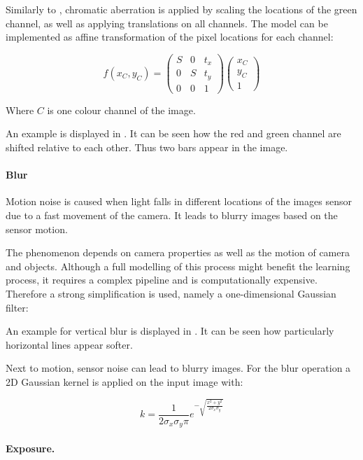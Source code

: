 Similarly to \cite{Carlson2018}, chromatic aberration is applied by scaling the locations of the green channel, as well as applying translations on all channels. The model can be implemented as affine transformation of the pixel locations for each channel:

\begin{equation}
f(x_C,y_C) = \begin{pmatrix}
S & 0 & t_x \\
0 & S & t_y \\
0 & 0 & 1
\end{pmatrix} \begin{pmatrix}
x_C \\
y_C \\
1
\end{pmatrix}
\end{equation}

Where $C$ is one colour channel of the image.

An example is displayed in . It can be seen how the red and green channel are shifted relative to each other. Thus two bars appear in the image.

\paragraph{Blur}

Motion noise is caused when light falls in different locations of the images sensor due to a fast movement of the camera. It leads to blurry images based on the sensor motion.

The phenomenon depends on camera properties as well as the motion of camera and objects. Although a full modelling of this process might benefit the learning process, it requires a complex pipeline and is computationally expensive. Therefore a strong simplification is used, namely a one-dimensional Gaussian filter:

An example for vertical blur is displayed in . It can be seen how particularly horizontal lines appear softer.

Next to motion, sensor noise can lead to blurry images. For the blur operation a 2D Gaussian kernel is applied on the input image with:

\begin{equation}
 k = \frac{1}{2\sigma_x\sigma_y\pi}e^{-\sqrt{\frac{x^2 + y^2}{2\sigma_x\sigma_y}}} 
\end{equation}
\paragraph{Exposure.}

